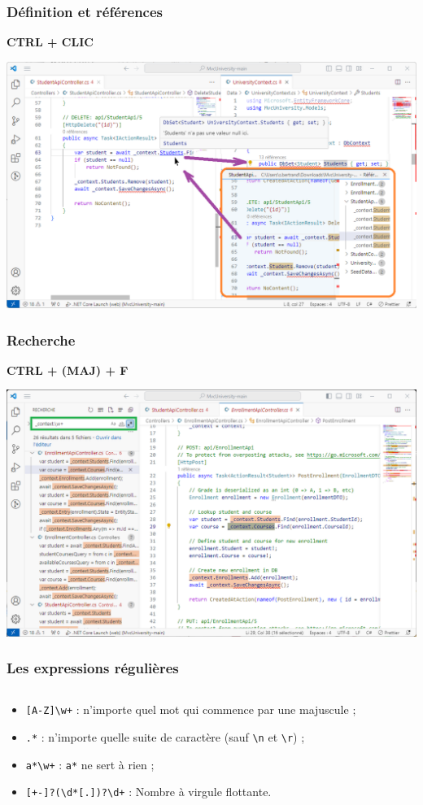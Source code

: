 \begin{frame}
    \frametitle{Définition et références}
    \centering
    \Huge
    \textbf{CTRL + CLIC}

    \includegraphics[height=0.4\linewidth]{figures/environnement/controle-clic}
\end{frame}

\begin{frame}
    \frametitle{Recherche}
    \centering
    \Huge
    \textbf{CTRL + (MAJ) + F}

    \includegraphics[height=0.4\linewidth]{figures/environnement/rechercher}
\end{frame}

\begin{frame}[fragile]
    \frametitle{Les expressions régulières}
    \begin{columns}
        \begin{column}{0.7\textwidth}
            \begin{itemize}
                \item \verb|[A-Z]\w+| : n'importe quel mot qui commence par une majuscule ;
                \item \verb|.*| : n'importe quelle suite de caractère (sauf \verb|\n| et \verb|\r|) ;
                \item \verb|a*\w+| : \verb|a*| ne sert à rien ;
                \item \verb|[+-]?(\d*[.])?\d+| : Nombre à virgule flottante.
            \end{itemize}
        \end{column}
        \begin{column}{0.3\textwidth}
            \centering

        \end{column}
    \end{columns}
\end{frame}

